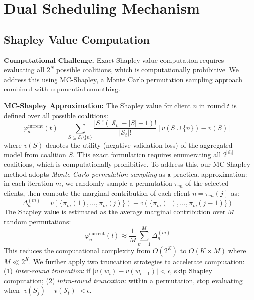 \section{Dual Scheduling Mechanism}

\subsection{Shapley Value Computation}

\textbf{Computational Challenge:} Exact Shapley value computation requires evaluating all $2^N$ possible coalitions, which is computationally prohibitive. We address this using MC-Shapley, a Monte Carlo permutation sampling approach combined with exponential smoothing.

\textbf{MC-Shapley Approximation:} The Shapley value for client $n$ in round $t$ is defined over all possible coalitions:
\begin{equation}
\varphi_n^{\text{current}}(t) = \sum_{S \subseteq \mathcal{S}_t \setminus \{n\}} \frac{|S|!(|\mathcal{S}_t| - |S| - 1)!}{|\mathcal{S}_t|!} \left[v(S \cup \{n\}) - v(S)\right]
\end{equation}
where $v(S)$ denotes the utility (negative validation loss) of the aggregated model from coalition $S$. This exact formulation requires enumerating all $2^{|\mathcal{S}_t|}$ coalitions, which is computationally prohibitive. To address this, our MC-Shapley method adopts \textit{Monte Carlo permutation sampling} as a practical approximation: in each iteration $m$, we randomly sample a permutation $\pi_m$ of the selected clients, then compute the marginal contribution of each client $n = \pi_m(j)$ as:
\begin{equation}
\Delta_n^{(m)} = v(\{\pi_m(1), \ldots, \pi_m(j)\}) - v(\{\pi_m(1), \ldots, \pi_m(j-1)\})
\end{equation}
The Shapley value is estimated as the average marginal contribution over $M$ random permutations:
\begin{equation}
\varphi_n^{\text{current}}(t) \approx \frac{1}{M} \sum_{m=1}^{M} \Delta_n^{(m)}
\end{equation}
This reduces the computational complexity from $O(2^K)$ to $O(K \times M)$ where $M \ll 2^K$. We further apply two truncation strategies to accelerate computation: (1) \textit{inter-round truncation}: if $|v(w_t) - v(w_{t-1})| < \epsilon$, skip Shapley computation; (2) \textit{intra-round truncation}: within a permutation, stop evaluating when $|v(S_j) - v(\mathcal{S}_t)| < \epsilon$.

